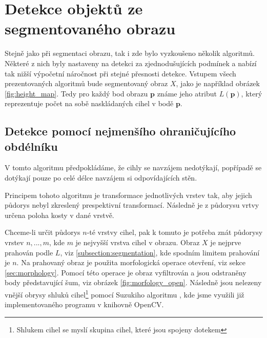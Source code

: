 \documentclass[twoside]{ctuthesis}
\newcommand{\tl}[1]{$\mathbf{#1}$}
\begin{document}
\section{Detekce objektů ze segmentovaného obrazu}
Stejně jako při segmentaci obrazu, tak i zde bylo vyzkoušeno několik algoritmů. Některé z nich byly nastaveny na detekci za zjednodušujících podmínek a nabízí tak nižší výpočetní náročnost při stejné přesnosti detekce. 
Vstupem všech prezentovaných algoritmů bude segmentovaný obraz $X$, jako je například obrázek \ref{fig:height_map}. Tedy pro každý bod obrazu \tl{p} známe jeho atribut $L(\mathbf{p})$, který reprezentuje počet na sobě naskládaných cihel v bodě \tl{p}. %

\subsection{Detekce pomocí nejmenšího ohraničujícího obdélníku}
\label{sec:bounding_rect}
V tomto algoritmu předpokládáme, že cihly se navzájem nedotýkají, popřípadě se dotýkají pouze po celé délce navzájem si odpovídajících stěn.

Principem tohoto algoritmu je transformace jednotlivých vrstev tak, aby jejich půdorys nebyl zkreslený prespektivní transformací. Následně je z půdorysu vrtvy určena poloha kosty v dané vrstvě.

Chceme-li určit půdorys $n$-té vrstvy cihel, pak k tomuto je potřeba znát půdorysy vrstev $n,...,m$, kde $m$ je nejvyšší vrstva cihel v obrazu. 
Obraz $X$ je nejprve prahován podle $L$, viz \ref{subsection:segmentation}, kde spodním limitem prahování je $n$. Na prahovaný obraz je použita morfologická operace otevření, viz sekce \ref{sec:morphology}. Pomocí této operace je obraz vyfiltrován a jsou odstraněny body představující šum, viz obrázek \ref{fig:morfology_open}. Následně jsou nelezeny vnější obrysy  shluků cihel\footnote{Shlukem cihel se myslí skupina cihel, které jsou spojeny dotekem} pomocí Suzukiho algoritmu \cite{suzuki1985topological}, kde jsme využili již implementovaného programu v knihovně OpenCV.
\end{document}
